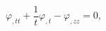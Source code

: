 \begin{equation}
  \label{eq:K-G}
  {\varphi_{,tt}}+\frac{1}{t}{\varphi_{,t}}-{\varphi_{,zz}}=0,
\end{equation}

